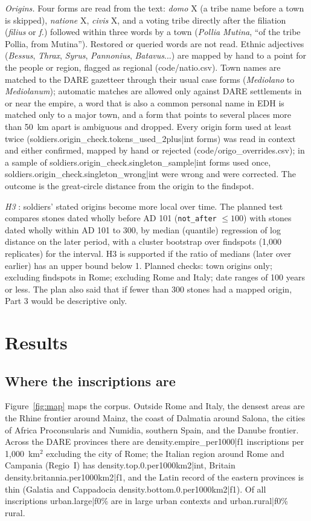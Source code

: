 \textit{Origins.} Four forms are read from the text: \textit{domo} X (a tribe name before a town is skipped), \textit{natione} X, \textit{civis} X, and a voting tribe directly after the filiation (\textit{filius} or \textit{f.}) followed within three words by a town (\textit{Pollia Mutina}, ``of the tribe Pollia, from Mutina''). Restored or queried words are not read. Ethnic adjectives (\textit{Bessus}, \textit{Thrax}, \textit{Syrus}, \textit{Pannonius}, \textit{Batavus}...) are mapped by hand to a point for the people or region, flagged as regional (code/natio.csv). Town names are matched to the DARE gazetteer through their usual case forms (\textit{Mediolano} to \textit{Mediolanum}); automatic matches are allowed only against DARE settlements in or near the empire, a word that is also a common personal name in EDH is matched only to a major town, and a form that points to several places more than 50~km apart is ambiguous and dropped. Every origin form used at least twice ({{soldiers.origin_check.tokens_used_2plus|int}} forms) was read in context and either confirmed, mapped by hand or rejected (code/origo\_overrides.csv); in a sample of {{soldiers.origin_check.singleton_sample|int}} forms used once, {{soldiers.origin_check.singleton_wrong|int}} were wrong and were corrected. The outcome is the great-circle distance from the origin to the findspot.

\textit{H3} \citep{forni1953,mann1983}: soldiers' stated origins become more local over time. The planned test compares stones dated wholly before AD 101 (\texttt{not\_after} $\leq 100$) with stones dated wholly within AD 101 to 300, by median (quantile) regression of log distance on the later period, with a cluster bootstrap over findspots (1,000 replicates) for the interval. H3 is supported if the ratio of medians (later over earlier) has an upper bound below 1. Planned checks: town origins only; excluding findspots in Rome; excluding Rome and Italy; date ranges of 100 years or less. The plan also said that if fewer than 300 stones had a mapped origin, Part 3 would be descriptive only.

\section{Results}\label{sec:results}
\subsection{Where the inscriptions are}
Figure~\ref{fig:map} maps the corpus. Outside Rome and Italy, the densest areas are the Rhine frontier around Mainz, the coast of Dalmatia around Salona, the cities of Africa Proconsularis and Numidia, southern Spain, and the Danube frontier. Across the DARE provinces there are {{density.empire_per1000|f1}} inscriptions per 1,000~km$^2$ excluding the city of Rome; the Italian region around Rome and Campania (Regio~I) has {{density.top.0.per1000km2|int}}, Britain {{density.britannia.per1000km2|f1}}, and the Latin record of the eastern provinces is thin (Galatia and Cappadocia {{density.bottom.0.per1000km2|f1}}). Of all inscriptions {{urban.large|f0}}\% are in large urban contexts and {{urban.rural|f0}}\% rural.

